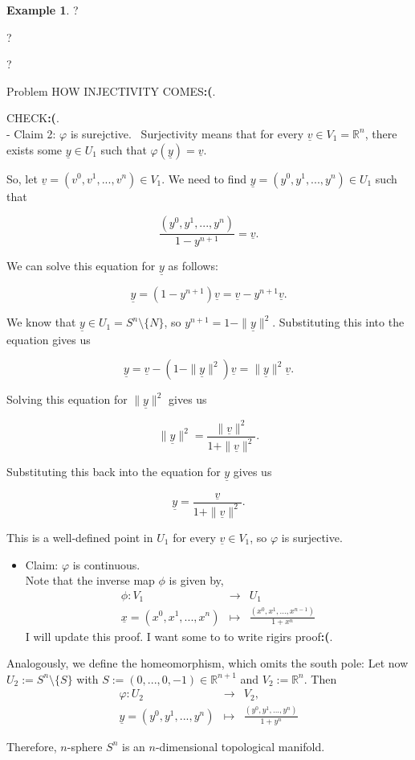 \documentclass[
]{book}
\providecommand{\tightlist}{%
  \setlength{\itemsep}{0pt}\setlength{\parskip}{0pt}}
\theoremstyle{definition}
\theoremstyle{definition}
\newtheorem{example}{Example}[chapter]
\theoremstyle{definition}
\theoremstyle{definition}
\theoremstyle{remark}
\begin{document}
\begin{example}
?

?

?

{Problem HOW INJECTIVITY COMES\textbf{:(}}.

{CHECK\textbf{:(}}.\\
- Claim 2: \(\varphi\) is surejctive.~
Surjectivity means that for every \(\underline{v} \in V_1 = \mathbb{R}^n\), there exists some \(\underline{y} \in U_1\) such that \(\varphi(\underline{y}) = \underline{v}\).

So, let \(\underline{v} = (v^0, v^1, ..., v^n) \in V_1\). We need to find \(\underline{y} = (y^0, y^1, ..., y^n) \in U_1\) such that

\[\frac{(y^0, y^1, ..., y^n)}{1-y^{n+1}} = \underline{v}.\]

We can solve this equation for \(\underline{y}\) as follows:

\[\underline{y} = (1-y^{n+1})\underline{v} = \underline{v} - y^{n+1}\underline{v}.\]

We know that \(\underline{y} \in U_1 = S^n \setminus \{N\}\), so \(y^{n+1} = 1 - \|\underline{y}\|^2\). Substituting this into the equation gives us

\[\underline{y} = \underline{v} - (1 - \|\underline{y}\|^2)\underline{v} = \|\underline{y}\|^2\underline{v}.\]

Solving this equation for \(\|\underline{y}\|^2\) gives us

\[\|\underline{y}\|^2 = \frac{\|\underline{v}\|^2}{1 + \|\underline{v}\|^2}.\]

Substituting this back into the equation for \(\underline{y}\) gives us

\[\underline{y} = \frac{\underline{v}}{1 + \|\underline{v}\|^2}.\]

This is a well-defined point in \(U_1\) for every \(\underline{v} \in V_1\), so \(\varphi\) is surjective.

\begin{itemize}
\tightlist
\item
  Claim: \(\varphi\) is continuous.\\
  Note that the inverse map \(\phi\) is given by,
  \begin{eqnarray}
  \phi : V_1 &\rightarrow & U_1\\
  \underline{x}= (x^0, x^1, ... , x^n) &\mapsto & \frac{(x^0,x^1,...,x^{n-1})}{1 + x^n} 
  \end{eqnarray}
  {I will update this proof. I want some to to write rigirs proof\textbf{:(}}.
\end{itemize}

Analogously, we define the homeomorphism, which omits the south pole:
Let now \(U_2 := S^n \setminus \{S\}\) with \(S := ( 0,... , 0, -1) \in \mathbb{R}^{n+1}\) and \(V_2 := \mathbb{R}^n\).
Then
\begin{eqnarray}
\varphi : U_2 &\rightarrow & V_2,\\
\underline{y}= (y^0, y^1, ... , y^n) &\mapsto & \frac{(y^0,y^1,...,y^n)}{1 + y^n} 
\end{eqnarray}

Therefore, \(n\)-sphere \(S^n\) is an \(n\)-dimensional topological manifold.
\end{example}
\end{document}
